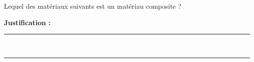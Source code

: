 Lequel des matériaux suivants est un matériau composite ?

\choices

\noindent\textbf{Justification :} \hrulefill \\[2.5ex]
\rule{\linewidth}{0.4pt} \\[2.5ex]
\rule{\linewidth}{0.4pt}
\vfill
